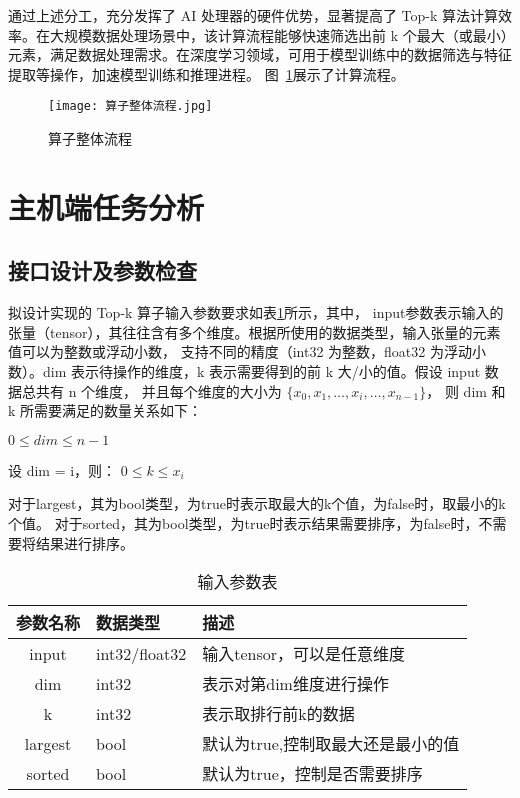 通过上述分工，充分发挥了 AI 处理器的硬件优势，显著提高了 Top-k 算法计算效率。在大规模数据处理场景中，该计算流程能够快速筛选出前 k 个最大（或最小）元素，满足数据处理需求。在深度学习领域，可用于模型训练中的数据筛选与特征提取等操作，加速模型训练和推理进程。
图~\ref{fig:topk}展示了计算流程。
\begin{figure}[ht]
    \centering
    \texttt{[image: 算子整体流程.jpg]}
    \caption{算子整体流程}
    \label{fig:topk}
\end{figure}




\section{主机端任务分析}
    \subsection{接口设计及参数检查}
    拟设计实现的 Top-k 算子输入参数要求如表\ref{tab:input_tab}所示，其中，
    input参数表示输入的张量（tensor），其往往含有多个维度。根据所使用的数据类型，输入张量的元素值可以为整数或浮动小数，
    支持不同的精度（int32 为整数，float32 为浮动小数）。dim 表示待操作的维度，k 表示需要得到的前 k 大/小的值。假设 input 数据总共有 n 个维度，
    并且每个维度的大小为 $\{ x_{0}, x_{1}, \dots, x_{i}, \dots, x_{n-1} \}$，
    则 dim 和 k 所需要满足的数量关系如下：

    \begin{center}
        $0 \leq dim \leq n - 1$
        
        设 dim = i，则： $0 \leq k \leq x_{i}$
    \end{center}
    对于largest，其为bool类型，为true时表示取最大的k个值，为false时，取最小的k个值。
    对于sorted，其为bool类型，为true时表示结果需要排序，为false时，不需要将结果进行排序。
    \begin{table}
        \centering
        \caption{输入参数表}
        \label{tab:input_tab}
        \begin{tabular}{cll} %
          \toprule
          参数名称   & 数据类型                                       & 描述                          \\
          \midrule
          input & int32/float32 & 输入tensor，可以是任意维度                      \\
          dim & int32   & 表示对第dim维度进行操作            \\
          k   & int32   & 表示取排行前k的数据              \\
          largest & bool   & 默认为true,控制取最大还是最小的值            \\
          sorted & bool   & 默认为true，控制是否需要排序            \\
          
          \bottomrule
        \end{tabular}
    \end{table}

